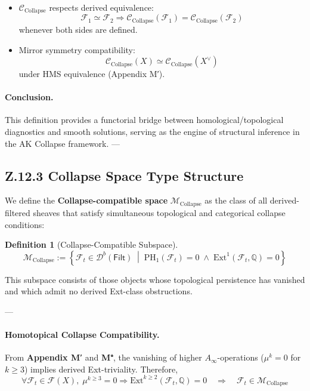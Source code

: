 \documentclass[11pt]{article}
\newtheorem{definition}[theorem]{Definition}
\begin{document}
\begin{axiom}
\begin{axiom}
{{\begin{itemize}
  \item \( \mathcal{C}_{\text{Collapse}} \) respects derived equivalence:
  \[
  \mathcal{F}_1 \simeq \mathcal{F}_2 \Rightarrow
  \mathcal{C}_{\text{Collapse}}(\mathcal{F}_1) = \mathcal{C}_{\text{Collapse}}(\mathcal{F}_2)
  \]
  whenever both sides are defined.

  \item Mirror symmetry compatibility:
  \[
  \mathcal{C}_{\text{Collapse}}(X) \simeq \mathcal{C}_{\text{Collapse}}(X^\vee)
  \]
  under HMS equivalence (Appendix M′).
\end{itemize}

\paragraph{Conclusion.}

This definition provides a functorial bridge between homological/topological diagnostics and smooth solutions,  
serving as the engine of structural inference in the AK Collapse framework.
---

\subsection*{Z.12.3 Collapse Space Type Structure}

We define the \textbf{Collapse-compatible space} \( \mathcal{M}_{\mathrm{Collapse}} \)  
as the class of all derived-filtered sheaves that satisfy simultaneous topological and categorical collapse conditions:

\begin{definition}[Collapse-Compatible Subspace]
\[
\mathcal{M}_{\mathrm{Collapse}} := \left\{
\mathcal{F}_t \in \mathcal{D}^b(\mathsf{Filt}) \;\middle|\;
\mathrm{PH}_1(\mathcal{F}_t) = 0 \;\land\; \mathrm{Ext}^1(\mathcal{F}_t, \mathbb{Q}) = 0
\right\}
\]
\end{definition}

This subspace consists of those objects whose topological persistence has vanished  
and which admit no derived Ext-class obstructions.

---

\paragraph{Homotopical Collapse Compatibility.}  
From \textbf{Appendix M′} and \textbf{M⁺}, the vanishing of higher \( A_\infty \)-operations (\( \mu^k = 0 \) for \( k \geq 3 \))  
implies derived Ext-triviality. Therefore,  
\[
\forall \mathcal{F}_t \in \mathcal{F}(X),\;
\mu^{k \geq 3} = 0 \Rightarrow \mathrm{Ext}^{k \geq 2}(\mathcal{F}_t, \mathbb{Q}) = 0
\quad \Rightarrow \quad \mathcal{F}_t \in \mathcal{M}_{\mathrm{Collapse}}
\]

}}
\end{axiom}
\end{axiom}
\end{document}
